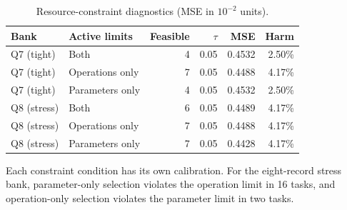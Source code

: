 \begin{table}[pos=!htbp]
\centering\footnotesize
\caption{Resource-constraint diagnostics (MSE in $10^{-2}$ units).}\label{tab:s-constraints}
\begin{tabular}{llrrrr}
\toprule
Bank & Active limits & Feasible & $\tau$ & MSE & Harm\\\midrule
Q7 (tight) & Both & 4 & 0.05 & 0.4532 & 2.50\%\\
Q7 (tight) & Operations only & 7 & 0.05 & 0.4488 & 4.17\%\\
Q7 (tight) & Parameters only & 4 & 0.05 & 0.4532 & 2.50\%\\
Q8 (stress) & Both & 6 & 0.05 & 0.4489 & 4.17\%\\
Q8 (stress) & Operations only & 7 & 0.05 & 0.4488 & 4.17\%\\
Q8 (stress) & Parameters only & 7 & 0.05 & 0.4428 & 4.17\%\\
\bottomrule
\end{tabular}
\par\vspace{3pt}\begin{minipage}{\linewidth}\footnotesize Each constraint condition has its own calibration. For the eight-record stress bank, parameter-only selection violates the operation limit in 16 tasks, and operation-only selection violates the parameter limit in two tasks.\end{minipage}
\end{table}
